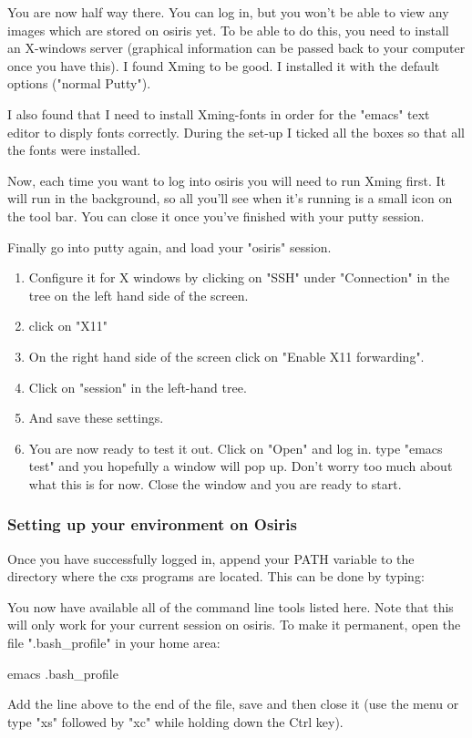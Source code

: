 \documentclass[]{cxs-software}
\begin{document}
You are now half way there. You can log in, but you won't be able to
view any images which are stored on osiris yet. To be able to do this,
you need to install an X-windows server (graphical information can be
passed back to your computer once you have this). I found Xming to be
good. I installed it with the default options ("normal Putty").

I also found that I need to install Xming-fonts in order for the
"emacs" text editor to disply fonts correctly. During the set-up I
ticked all the boxes so that all the fonts were installed.

Now, each time you want to log into osiris you will need to run Xming
first. It will run in the background, so all you'll see when it's
running is a small icon on the tool bar. You can close it once you've
finished with your putty session.

Finally go into putty again, and load your "osiris" session. 
\begin{enumerate}
\item Configure it for X windows by clicking on "SSH" under "Connection" in the tree on the left hand side of the screen. 
\item click on "X11" 
\item On the right hand side of the screen click on "Enable X11 forwarding". 
\item Click on "session" in the left-hand tree. 
\item And save these settings. 
\item You are now ready to test it out. Click on "Open" and log in. type "emacs test" and you hopefully a window will pop up. Don't worry too much about what this is for now. Close the window and you are ready to start.
\end{enumerate}

\subsubsection{Setting up your environment on Osiris}
\label{osiris-setup}
Once you have successfully logged in, append your PATH variable to the
directory where the cxs programs are located. This can be done by
typing:

You now have available all of the command line tools listed here. Note
that this will only work for your current session on osiris. To make
it permanent, open the file ".bash\_profile" in your home area:
\begin{myverbatim}
  emacs .bash_profile 
\end{myverbatim}
Add the line above to the end of the file, save and then close it (use
the menu or type "xs" followed by "xc" while holding down the Ctrl
key).
\end{document}
